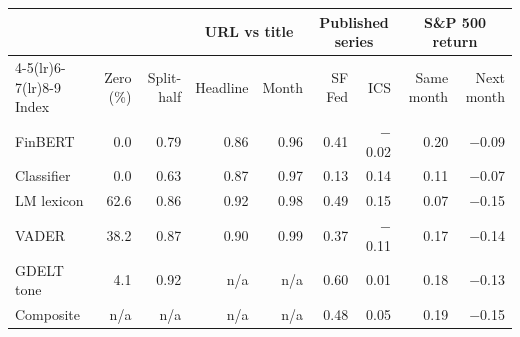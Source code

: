 \begin{tabular}{lrrrrrrrr}
\toprule
 &  &  & \multicolumn{2}{c}{URL vs title} & \multicolumn{2}{c}{Published series} & \multicolumn{2}{c}{S\&P 500 return} \\
\cmidrule(lr){4-5}\cmidrule(lr){6-7}\cmidrule(lr){8-9}
Index & Zero (\%) & Split-half & Headline & Month & SF Fed & ICS & Same month & Next month \\
\midrule
FinBERT & 0.0 & 0.79 & 0.86 & 0.96 & 0.41 & $-$0.02 & 0.20 & $-$0.09 \\
Classifier & 0.0 & 0.63 & 0.87 & 0.97 & 0.13 & 0.14 & 0.11 & $-$0.07 \\
LM lexicon & 62.6 & 0.86 & 0.92 & 0.98 & 0.49 & 0.15 & 0.07 & $-$0.15 \\
VADER & 38.2 & 0.87 & 0.90 & 0.99 & 0.37 & $-$0.11 & 0.17 & $-$0.14 \\
GDELT tone & 4.1 & 0.92 & n/a & n/a & 0.60 & 0.01 & 0.18 & $-$0.13 \\
Composite & n/a & n/a & n/a & n/a & 0.48 & 0.05 & 0.19 & $-$0.15 \\
\bottomrule
\end{tabular}
